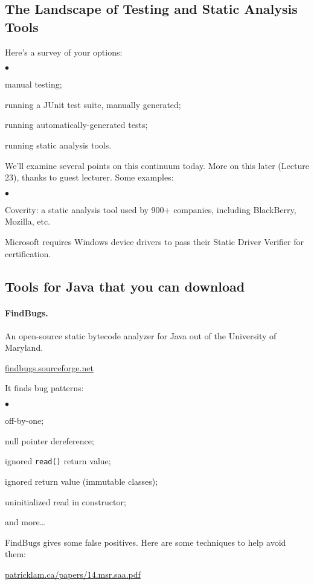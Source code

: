 \documentclass[11pt]{article}
\newcommand{\squishlist}{
 \begin{list}{$\bullet$}
  { \setlength{\itemsep}{0pt}
     \setlength{\parsep}{3pt}
     \setlength{\topsep}{3pt}
     \setlength{\partopsep}{0pt}
     \setlength{\leftmargin}{1.5em}
     \setlength{\labelwidth}{1em}
     \setlength{\labelsep}{0.5em} } }
\newcommand{\squishend}{
  \end{list}  }
\begin{document}
\subsection*{The Landscape of Testing and Static Analysis Tools}
Here's a survey of your options:
\squishlist
    \item manual testing;
    \item running a JUnit test suite, manually generated;
    \item running automatically-generated tests;
    \item running static analysis tools.
\squishend
We'll examine several points on this continuum today.
More on this later (Lecture 23), thanks to guest lecturer. Some examples:
\squishlist
    \item Coverity: a static analysis tool used by 900+ companies, 
      including BlackBerry, Mozilla, etc.
    \item Microsoft requires Windows device drivers 
      to pass their Static Driver Verifier for certification.
\squishend
      
\subsection*{Tools for Java that you can download}

\paragraph{FindBugs.} An open-source static bytecode analyzer for Java out of
the University of Maryland.
\begin{center}
  \url{findbugs.sourceforge.net}
\end{center}
It finds bug patterns:
\squishlist
    \item off-by-one;
    \item null pointer dereference;
    \item ignored {\tt read()} return value;
    \item ignored return value (immutable classes);
    \item uninitialized read in constructor;
    \item and more\ldots
\squishend

FindBugs gives some false positives. 
Here are some techniques to help avoid them:
\begin{center}
  \url{patricklam.ca/papers/14.msr.saa.pdf}
\end{center}
\end{document}
